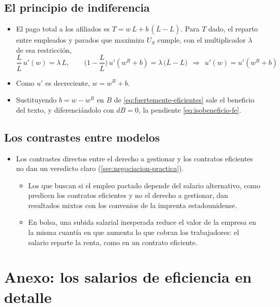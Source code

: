 \documentclass[11pt]{article}
\begin{document}
\subsection{El principio de indiferencia}\label{anexo:indiferencia}

\begin{itemize}
\item El pago total a los afiliados es $T=w\,L+b\,(\overline{L}-L)$. Para $T$ dado, el reparto entre empleados y parados que maximiza $U_S$ cumple, con el multiplicador $\lambda$ de esa restricción,
  $$\frac{L}{\overline{L}}\,u'(w)=\lambda\,L,\qquad \Big(1-\frac{L}{\overline{L}}\Big)\,u'(w^R+b)=\lambda\,\big(\overline{L}-L\big)\ \ \Longrightarrow\ \ u'(w)=u'(w^R+b)$$
\item Como $u'$ es decreciente, $w=w^R+b$.
\item Sustituyendo $b=w-w^R$ en $B$ de \eqref{eq:fuertemente-eficientes} sale el beneficio del texto, y diferenciándolo con $dB=0$, la pendiente \eqref{eq:isobeneficio-fe}.\findemo
\end{itemize}

\subsection{Los contrastes entre modelos}\label{anexo:contrastes}

\begin{itemize}
\item Los contrastes directos entre el derecho a gestionar y los contratos eficientes no dan un veredicto claro (\ref{sec:negociacion-practica}).
  \begin{itemize}
  \item Los que buscan si el empleo pactado depende del salario alternativo, como predicen los contratos eficientes y no el derecho a gestionar, dan resultados mixtos con los convenios de la imprenta estadounidense\nocite{MaCurdyPencavel1986Testing,BrownAshenfelter1986Testing}.
  \item En bolsa, una subida salarial inesperada reduce el valor de la empresa en la misma cuantía en que aumenta lo que cobran los trabajadores: el salario reparte la renta, como en un contrato eficiente\nocite{Abowd1989Effect}.
  \end{itemize}
\end{itemize}

\section{Anexo: los salarios de eficiencia en detalle}\label{anexo:shapiro-stiglitz}
\end{document}
